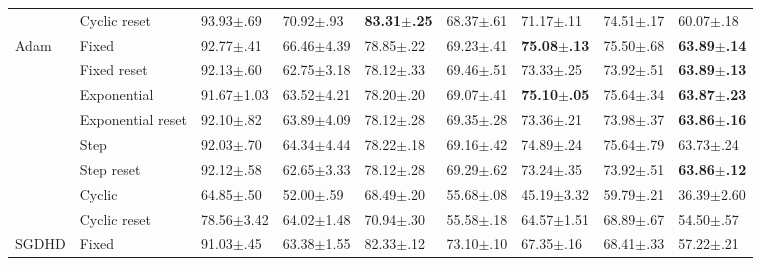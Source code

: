 \begin{tabular}{lllllllll}
                             & Cyclic reset      & 93.93$\pm$.69           & 70.92$\pm$.93            & \bfseries 83.31$\pm$.25 & 68.37$\pm$.61           & 71.17$\pm$.11           & 74.51$\pm$.17           & 60.07$\pm$.18           \\
    \multirow[c]{8}{*}{Adam} & Fixed             & 92.77$\pm$.41           & 66.46$\pm$4.39           & 78.85$\pm$.22           & 69.23$\pm$.41           & \bfseries 75.08$\pm$.13 & 75.50$\pm$.68           & \bfseries 63.89$\pm$.14 \\
                             & Fixed reset       & 92.13$\pm$.60           & 62.75$\pm$3.18           & 78.12$\pm$.33           & 69.46$\pm$.51           & 73.33$\pm$.25           & 73.92$\pm$.51           & \bfseries 63.89$\pm$.13 \\
                             & Exponential       & 91.67$\pm$1.03          & 63.52$\pm$4.21           & 78.20$\pm$.20           & 69.07$\pm$.41           & \bfseries 75.10$\pm$.05 & 75.64$\pm$.34           & \bfseries 63.87$\pm$.23 \\
                             & Exponential reset & 92.10$\pm$.82           & 63.89$\pm$4.09           & 78.12$\pm$.28           & 69.35$\pm$.28           & 73.36$\pm$.21           & 73.98$\pm$.37           & \bfseries 63.86$\pm$.16 \\
                             & Step              & 92.03$\pm$.70           & 64.34$\pm$4.44           & 78.22$\pm$.18           & 69.16$\pm$.42           & 74.89$\pm$.24           & 75.64$\pm$.79           & 63.73$\pm$.24           \\
                             & Step reset        & 92.12$\pm$.58           & 62.65$\pm$3.33           & 78.12$\pm$.28           & 69.29$\pm$.62           & 73.24$\pm$.35           & 73.92$\pm$.51           & \bfseries 63.86$\pm$.12 \\
                             & Cyclic            & 64.85$\pm$.50           & 52.00$\pm$.59            & 68.49$\pm$.20           & 55.68$\pm$.08           & 45.19$\pm$3.32          & 59.79$\pm$.21           & 36.39$\pm$2.60          \\
                             & Cyclic reset      & 78.56$\pm$3.42          & 64.02$\pm$1.48           & 70.94$\pm$.30           & 55.58$\pm$.18           & 64.57$\pm$1.51          & 68.89$\pm$.67           & 54.50$\pm$.57           \\
    SGDHD                    & Fixed             & 91.03$\pm$.45           & 63.38$\pm$1.55           & 82.33$\pm$.12           & 73.10$\pm$.10           & 67.35$\pm$.16           & 68.41$\pm$.33           & 57.22$\pm$.21           \\

\end{tabular}
